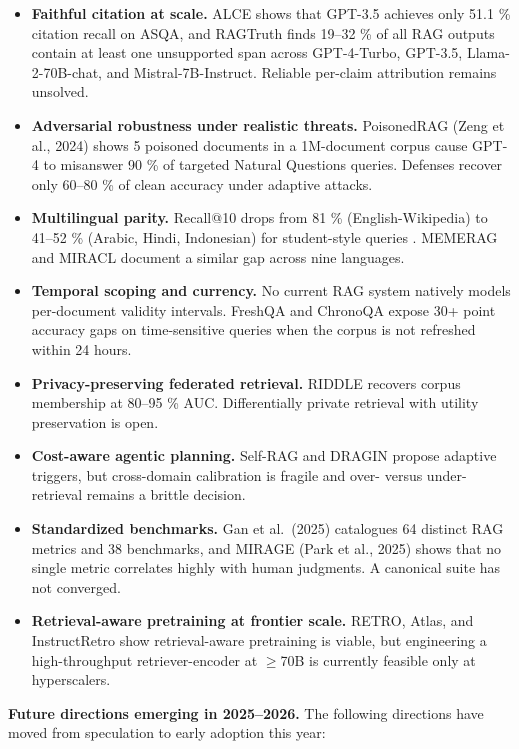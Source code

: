 \documentclass{article}
\begin{document}
\begin{itemize}

\item
  \textbf{Faithful citation at scale.} ALCE shows that GPT-3.5 achieves only 51.1 \% citation recall on ASQA, and RAGTruth finds 19--32 \% of all RAG outputs contain at least one unsupported span across GPT-4-Turbo, GPT-3.5, Llama-2-70B-chat, and Mistral-7B-Instruct. Reliable per-claim attribution remains unsolved.
\item
  \textbf{Adversarial robustness under realistic threats.} PoisonedRAG (Zeng et al., 2024) shows 5 poisoned documents in a 1M-document corpus cause GPT-4 to misanswer 90 \% of targeted Natural Questions queries. Defenses recover only 60--80 \% of clean accuracy under adaptive attacks.
\item
  \textbf{Multilingual parity.} Recall@10 drops from 81 \% (English-Wikipedia) to 41--52 \% (Arabic, Hindi, Indonesian) for student-style queries \citep{li20252025}. MEMERAG and MIRACL document a similar gap across nine languages.
\item
  \textbf{Temporal scoping and currency.} No current RAG system natively models per-document validity intervals. FreshQA and ChronoQA expose 30+ point accuracy gaps on time-sensitive queries when the corpus is not refreshed within 24 hours.
\item
  \textbf{Privacy-preserving federated retrieval.} RIDDLE \citep{naseh20252025} recovers corpus membership at 80--95 \% AUC. Differentially private retrieval with utility preservation is open.
\item
  \textbf{Cost-aware agentic planning.} Self-RAG and DRAGIN propose adaptive triggers, but cross-domain calibration is fragile and over- versus under-retrieval remains a brittle decision.
\item
  \textbf{Standardized benchmarks.} Gan et al.~(2025) catalogues 64 distinct RAG metrics and 38 benchmarks, and MIRAGE (Park et al., 2025) shows that no single metric correlates highly with human judgments. A canonical suite has not converged.
\item
  \textbf{Retrieval-aware pretraining at frontier scale.} RETRO, Atlas, and InstructRetro show retrieval-aware pretraining is viable, but engineering a high-throughput retriever-encoder at $\geq$70B is currently feasible only at hyperscalers.
\end{itemize}

\textbf{Future directions emerging in 2025--2026.} The following directions have moved from speculation to early adoption this year:
\end{document}
